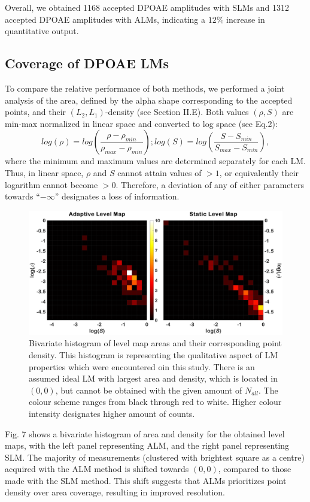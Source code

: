 \documentclass[journal,twoside,web]{ieeecolor2}
\begin{document}
Overall, we obtained 1168 accepted DPOAE amplitudes with SLMs and 1312 accepted DPOAE amplitudes with ALMs, indicating a $12\%$ increase in quantitative output.

\subsection{Coverage of DPOAE LMs}
To compare the relative performance of both methods, we performed a joint analysis of the area, defined by the alpha shape corresponding to the accepted points, and their $(L_2, L_1)$-density (see Section II.E). Both values $(\rho, S)$ are min-max normalized in linear space and converted to log space (see Eq.2):
\begin{equation} log(\rho) = log(\frac{\rho - \rho_{min}}{\rho_{max} - \rho_{min}}); log(S) = log(\frac{S - S_{min}}{S_{max} - S_{min}}), \label{eq2}\end{equation}
where the minimum and maximum values are determined separately for each LM. Thus, in linear space, $\rho$ and $S$ cannot attain values of $> 1$, or equivalently their logarithm cannot become $> 0$. Therefore, a deviation of any of either parameters towards “$-\infty$” designates a loss of information.

\begin{figure}
\centering
\includegraphics[width=.8\textwidth]{Fig_8_Coverage_sameClim.eps} %
\caption{Bivariate histogram of level map areas and their corresponding point density. This histogram is representing the qualitative aspect of LM properties which were encountered oin this study. There is an assumed ideal LM with largest area and density, which is located in $(0, 0)$, but cannot be obtained with the given amount of $N_{all}$. The colour scheme ranges from black through red to white. Higher colour intensity designates higher amount of counts.}
\label{fig_TGT}
\end{figure}

Fig. 7 shows a bivariate histogram of area and density for the obtained level maps, with the left panel representing ALM, and the right panel representing SLM. The majority of measurements (clustered with brightest square as a centre) acquired with the ALM method is shifted towards $(0, 0)$, compared to those made with the SLM method. This shift suggests that ALMs prioritizes point density over area coverage, resulting in improved resolution.
\end{document}
